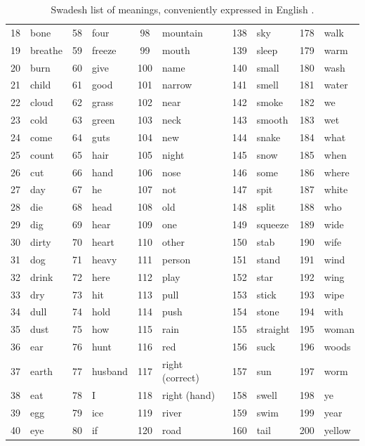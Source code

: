 \begin{table}[ht]
\begin{tabular}{cl|cl|cl|cl|cl}
18 & bone & 58 & four & 98 & mountain & 138 & sky & 178 & walk \\
19 & breathe & 59 & freeze & 99 & mouth & 139 & sleep & 179 & warm \\
20 & burn & 60 & give & 100 & name & 140 & small & 180 & wash \\
21 & child & 61 & good & 101 & narrow & 141 & smell & 181 & water \\
22 & cloud & 62 & grass & 102 & near & 142 & smoke & 182 & we \\
23 & cold & 63 & green & 103 & neck & 143 & smooth & 183 & wet \\
24 & come & 64 & guts & 104 & new & 144 & snake & 184 & what \\
25 & count & 65 & hair & 105 & night & 145 & snow & 185 & when \\
26 & cut & 66 & hand & 106 & nose & 146 & some & 186 & where \\
27 & day & 67 & he & 107 & not & 147 & spit & 187 & white \\
28 & die & 68 & head & 108 & old & 148 & split & 188 & who \\
29 & dig & 69 & hear & 109 & one & 149 & squeeze & 189 & wide \\
30 & dirty & 70 & heart & 110 & other & 150 & stab & 190 & wife \\
31 & dog & 71 & heavy & 111 & person & 151 & stand & 191 & wind \\
32 & drink & 72 & here & 112 & play & 152 & star & 192 & wing \\
33 & dry & 73 & hit & 113 & pull & 153 & stick & 193 & wipe \\
34 & dull & 74 & hold & 114 & push & 154 & stone & 194 & with \\
35 & dust & 75 & how & 115 & rain & 155 & straight & 195 & woman \\
36 & ear & 76 & hunt & 116 & red & 156 & suck & 196 & woods \\
37 & earth & 77 & husband & 117 & right (correct) & 157 & sun & 197 & worm \\
38 & eat & 78 & I & 118 & right (hand) & 158 & swell & 198 & ye \\
39 & egg & 79 & ice & 119 & river & 159 & swim & 199 & year \\
40 & eye & 80 & if & 120 & road & 160 & tail & 200 & yellow \\
\bottomrule
\end{tabular}
\caption{Swadesh list of meanings, conveniently expressed in English \cite{Swadesh1952}.} 
\label{tab:swadeshlist} 
\end{table}


